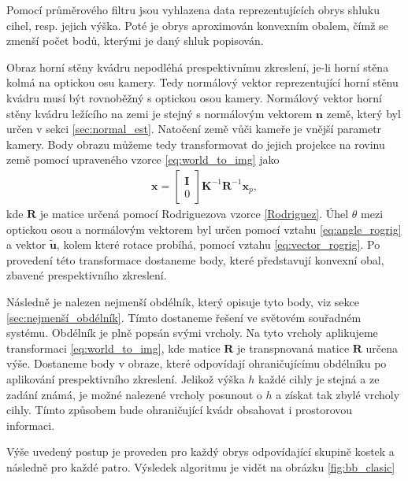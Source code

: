 \documentclass[twoside]{ctuthesis}
\newcommand{\tl}[1]{$\mathbf{#1}$}
\begin{document}
Pomocí průměrového filtru jsou vyhlazena data reprezentujících obrys shluku cihel, resp. jejich výška. Poté je obrys aproximován konvexním obalem, čímž se zmenší počet bodů, kterými je daný shluk popisován.

Obraz horní stěny kvádru nepodléhá prespektivnímu zkreslení, je-li horní stěna kolmá na optickou osu kamery. Tedy normálový vektor reprezentující horní stěnu kvádru musí být rovnoběžný s optickou osou kamery. Normálový vektor horní stěny kvádru ležícího na zemi je stejný s normálovým vektorem \tl{n} země, který byl určen v sekci \ref{sec:normal_est}. Natočení země vůči kameře je vnější parametr kamery. Body obrazu můžeme tedy transformovat do jejich projekce na rovinu země pomocí upraveného vzorce \ref{eq:world_to_img} jako %
\begin{align}
    \mathbf{x} = \begin{bmatrix} \mathbf{I} \\ 0 \end{bmatrix} \mathbf{K}^{-1} \mathbf{R}^{-1}\mathbf{x}_p, \label{eq:pic_to_world}
\end{align}
kde \tl{R} je matice určená pomocí Rodriguezova vzorce \ref{Rodriguez}. Úhel $\theta$ mezi optickou osou a normálovým vektorem byl určen pomocí vztahu \ref{eq:angle_rogrig} a vektor $\tilde{\mathbf{u}}$, kolem které rotace probíhá, pomocí vztahu \ref{eq:vector_rogrig}. Po provedení této transformace dostaneme body, které představují konvexní obal, zbavené prespektivního zkreslení.

Následně je nalezen nejmenší obdélník, který opisuje tyto body, viz sekce \ref{sec:nejmenší_obdélník}. Tímto dostaneme řešení ve světovém souřadném systému. Obdélník je plně popsán svými vrcholy. Na tyto vrcholy aplikujeme transformaci \ref{eq:world_to_img}, kde matice \tl{R} je transpnovaná matice \tl{R} určena výše. Dostaneme body v obraze, které odpovídají ohraničujícímu obdélníku po aplikování prespektivního zkreslení. Jelikož výška $h$ každé cihly je stejná a ze zadání známá, je možné nalezené vrcholy posunout o $h$ a získat tak zbylé vrcholy cihly. Tímto způsobem bude ohraničující kvádr obsahovat i prostorovou informaci.

Výše uvedený postup je proveden pro každý obrys odpovídající skupině kostek a následně pro každé patro. Výsledek algoritmu je vidět na obrázku \ref{fig:bb_clasic}
\end{document}

